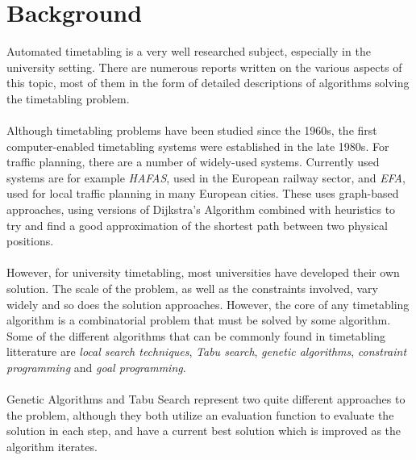 \documentclass[titlepage,a4paper]{article}
\begin{document}
\section{Background}
Automated timetabling is a very well researched subject, especially in the university setting. There are numerous reports written on the various aspects of this topic, most of them in the form of detailed descriptions of algorithms solving the timetabling problem\cite{guidedSearch09}\cite{anApp05}.\\\\
Although timetabling problems have been studied since the 1960s\cite{efficient03}, the first computer-enabled timetabling systems were established in the late 1980s\cite{timeTableInfo06}. For traffic planning, there are a number of widely-used systems. Currently used systems are for example \emph{HAFAS}, used in the European railway sector, and \emph{EFA}, used for local traffic planning in many European cities. These uses graph-based approaches, using versions of Dijkstra’s Algorithm combined with heuristics to try and find a good approximation of the shortest path between two physical positions\cite{timeTableInfo06}. \\\\
However, for university timetabling, most universities have developed their own solution\cite{efficient10}. The scale of the problem, as well as the constraints involved, vary widely and so does the solution approaches. However, the core of any timetabling algorithm is a combinatorial problem that must be solved by some algorithm. Some of the different algorithms that can be commonly found in timetabling litterature are \emph{local search techniques}, \emph{Tabu search}, \emph{genetic algorithms}, \emph{constraint programming} and \emph{goal programming}\cite{efficient03}. \\\\
Genetic Algorithms and Tabu Search represent two quite different approaches to the problem, although they both utilize an evaluation function to evaluate the solution in each step, and have a current best solution which is improved as the algorithm iterates.
\end{document}

